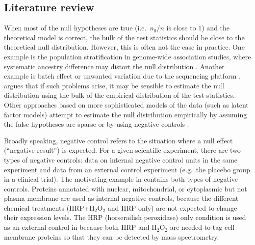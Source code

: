 \documentclass[a4paper,11pt]{article}
\theoremstyle{plain}
\theoremstyle{definition}
\theoremstyle{plain}
\newcommand{\No}{{n}}
\newcommand{\NoNull}{{n_0}}
\begin{document}
\subsection{Literature review}


When most of the null hypotheses are true (i.e.\ $\NoNull/\No$ is close
to $1$) and the theoretical model is correct, the bulk of the test
statistics should be close to the theoretical null
distribution. However, this is often not the case in practice. One
example is the population stratification in genome-wide association
studies, where systematic ancestry difference may distort the
null distribution
\parencite{price06_princ_compon_analy_correc_strat,hellwege17_popul_strat_genet_assoc_studies}. Another
example is batch effect or unwanted variation due to the sequencing
platform
\parencite{leek10_tackl_wides_critic_impac_batch}. \textcite{efron2004large}
argues that if such problems arise, it may be sensible to estimate the null
distribution using the bulk of the empirical distribution of the test
statistics. Other approaches based on more sophisticated models of the
data (such as latent factor models) attempt to estimate the null
distribution empirically by assuming the false hypotheses are sparse
\parencite{leek07_captur_heter_gene_expres_studies,wang17_confoun_adjus_multip_hypot_testin} or by using
negative controls
\parencite{gagnon2012using,wang17_confoun_adjus_multip_hypot_testin}.

Broadly speaking, negative control refers to the situation where a
null effect (``negative result'') is expected. For a given scientific
experiment, there are two types of negative controls: data on internal negative control
units in the same experiment and data from an external control
experiment (e.g.\ the placebo group in a clinical trial). The motivating
example in  contains both types of negative controls.
Proteins annotated with nuclear, mitochondrial, or cytoplasmic but not
plasma membrane are used as internal negative controls, because the
different
chemical treatments (HRP+H$_2$O$_2$ and HRP only) are not expected to
change their expression levels. The HRP (horseradish peroxidase) only condition is used as an
external control in \textcite{shuster2022situ} because both HRP and H$_2$O$_2$ are needed to tag cell
membrane proteins so that they can be detected by mass spectrometry.
\end{document}
